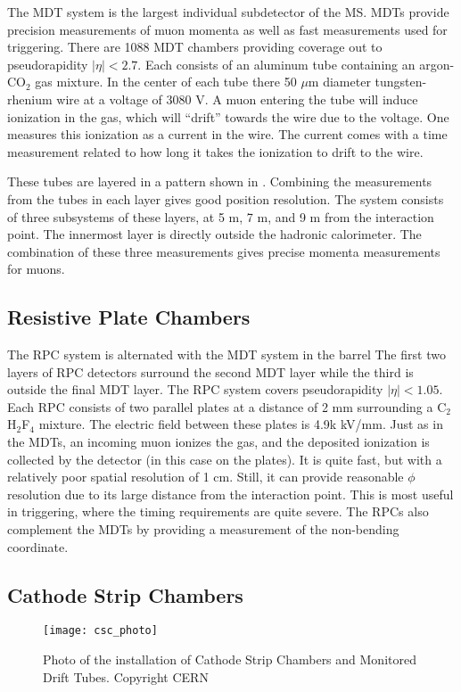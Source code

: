 The MDT system is the largest individual subdetector of the MS.
MDTs provide precision measurements of muon momenta as well as fast measurements used for triggering.
There are 1088 MDT chambers providing coverage out to pseudorapidity $|\eta| < 2.7 $.
Each consists of an aluminum tube containing an argon-CO$_2$ gas mixture.
In the center of each tube there 50 $\mu$m diameter tungsten-rhenium wire at a voltage of 3080 V.
A muon entering the tube will induce ionization in the gas, which will ``drift'' towards the wire due to the voltage.
One measures this ionization as a current in the wire.
The current comes with a time measurement related to how long it takes the ionization to drift to the wire.

These tubes are layered in a pattern shown in .
Combining the measurements from the tubes in each layer gives good position resolution.
The system consists of three subsystems of these layers, at 5 m, 7 m, and 9 m from the interaction point.
The innermost layer is directly outside the hadronic calorimeter.
The combination of these three measurements gives precise momenta measurements for muons.

\subsection{Resistive Plate Chambers}

The RPC system is alternated with the MDT system in the barrel
The first two layers of RPC detectors surround the second MDT layer while the third is outside the final MDT layer.
The RPC system covers pseudorapidity $|\eta| < 1.05 $.
Each RPC consists of two parallel plates at a distance of 2 mm surrounding a C$_2$H$_2$F$_4$ mixture.
The electric field between these plates is 4.9k kV/mm.
Just as in the MDTs, an incoming muon ionizes the gas, and the deposited ionization is collected by the detector (in this case on the plates).
It is quite fast, but with a relatively poor spatial resolution of 1 cm.
Still, it can provide reasonable $\phi$ resolution due to its large distance from the interaction point.
This is most useful in triggering, where the timing requirements are quite severe.
The RPCs also complement the MDTs by providing a measurement of the non-bending coordinate.

\subsection{Cathode Strip Chambers}
\begin{figure}[tbp]
\caption{Photo of the installation of Cathode Strip Chambers and Monitored Drift Tubes. Copyright CERN} \label{fig:csc_photo}
\texttt{[image: csc\_photo]}
\end{figure}

